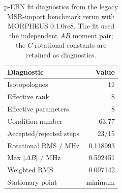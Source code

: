 \begin{table}
\caption{p-EBN fit diagnostics from the legacy MSR-import benchmark rerun with MORPHEUS 0.1.0rc8. The fit used the independent $AB$ moment pair; the $C$ rotational constants are retained as diagnostics.}
\label{tab:si-p-ebn-fit-diagnostics}
\centering
\begin{tabular}{lr}
\toprule
Diagnostic & Value \\
\midrule
Isotopologues & 11 \\
Effective rank & 8 \\
Effective parameters & 8 \\
Condition number & 63.77 \\
Accepted/rejected steps & 23/15 \\
Rotational RMS / MHz & 0.118993 \\
Max $|\Delta B|$ / MHz & 0.592451 \\
Weighted RMS & 0.097142 \\
Stationary point & minimum \\
\bottomrule
\end{tabular}
\end{table}
